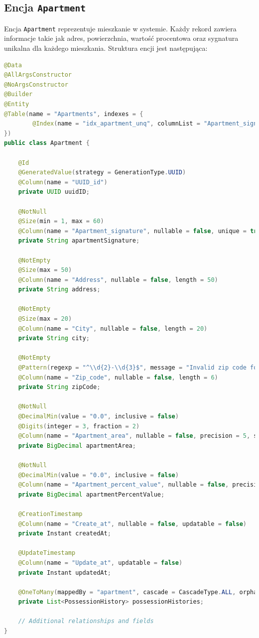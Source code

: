 \subsection{Encja \texttt{Apartment}}

Encja \texttt{Apartment} reprezentuje mieszkanie w systemie. Każdy rekord zawiera informacje takie jak adres, powierzchnia, wartość procentowa oraz sygnatura unikalna dla każdego mieszkania. Struktura encji jest następująca:

\begin{lstlisting}[language=Java, caption=Encja mieszkania \texttt{Apartment}]
@Data
@AllArgsConstructor
@NoArgsConstructor
@Builder
@Entity
@Table(name = "Apartments", indexes = {
        @Index(name = "idx_apartment_unq", columnList = "Apartment_signature", unique = true)
})
public class Apartment {

    @Id
    @GeneratedValue(strategy = GenerationType.UUID)
    @Column(name = "UUID_id")
    private UUID uuidID;

    @NotNull
    @Size(min = 1, max = 60)
    @Column(name = "Apartment_signature", nullable = false, unique = true, length = 60)
    private String apartmentSignature;

    @NotEmpty
    @Size(max = 50)
    @Column(name = "Address", nullable = false, length = 50)
    private String address;

    @NotEmpty
    @Size(max = 20)
    @Column(name = "City", nullable = false, length = 20)
    private String city;

    @NotEmpty
    @Pattern(regexp = "^\\d{2}-\\d{3}$", message = "Invalid zip code format")
    @Column(name = "Zip_code", nullable = false, length = 6)
    private String zipCode;

    @NotNull
    @DecimalMin(value = "0.0", inclusive = false)
    @Digits(integer = 3, fraction = 2)
    @Column(name = "Apartment_area", nullable = false, precision = 5, scale = 2)
    private BigDecimal apartmentArea;

    @NotNull
    @DecimalMin(value = "0.0", inclusive = false)
    @Column(name = "Apartment_percent_value", nullable = false, precision = 5, scale = 2)
    private BigDecimal apartmentPercentValue;

    @CreationTimestamp
    @Column(name = "Create_at", nullable = false, updatable = false)
    private Instant createdAt;

    @UpdateTimestamp
    @Column(name = "Update_at", updatable = false)
    private Instant updatedAt;

    @OneToMany(mappedBy = "apartment", cascade = CascadeType.ALL, orphanRemoval = true)
    private List<PossessionHistory> possessionHistories;

    // Additional relationships and fields
}
\end{lstlisting}

